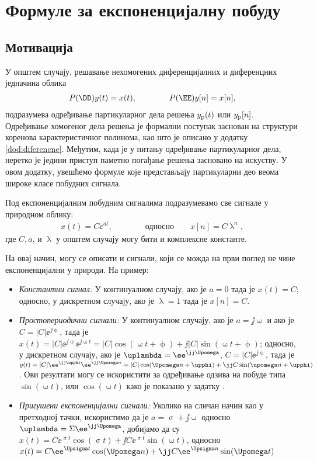 \chapter{Формуле за експоненцијалну побуду} \label{dod:exp_response}

\section*{Мотивација}

У општем случају, решавање нехомогених диференцијалних и диференцних једначина облика 
\begin{eqnarray}
    P(\DD) y(t) = x(t), \qquad\qquad P(\EE)y[n] = x[n],
\end{eqnarray}
подразумева одређивање партикуларног дела решења $y_{\rm p}(t)$ или $y_{\rm p}[n]$. 
Одређивање хомогеног дела решења је формални поступак заснован на структури  коренова карактеристичног полинома, као што је описано
у додатку \ref{dod:diferencne}. Међутим, када је у питању одређивање партикуларног дела, неретко је једини приступ паметно погађање
решења засновано на искуству. У овом додатку, увешћемо формуле које представљају партикуларни део веома широке класе побудних сигнала. 

Под експоненцијалним побудним сигналима подразумевамо све сигнале у природном облику:
\begin{eqnarray}
    x(t) = C \ee^{at}, \qquad\qquad \text{односно}  \quad\quad x[n] = C \uplambda^n,
\end{eqnarray}
где $C, a$, и $\uplambda$ у општем случају могу бити и комплексне константе. 

На овај начин, могу се описати и сигнали, који се можда на први поглед не чине експоненцијални у природи. На пример:
\begin{itemize}
    \item \emph{Константни сигнал:} У континуалном случају, ако је $a = 0$ тада је $x(t) = C$; односно, у дискретном случају, 
    ако је $\uplambda = 1$ тада је $x[n] = C$.
    \item \emph{Простопериодични сигнали:} У континуалном случају, ако је $a = \jj\upomega$ и ако је 
    $C = |C| \ee^{\jj\upphi}$, тада је 
    $x(t) = |C| \ee^{\jj\upphi} \ee^{\jj\upomega t} = |C|\cos(\upomega t + \upphi) + \jj |C| \sin(\upomega t + \upphi)$; односно, у дискретном случају, 
    ако је $\uplambda = \ee^{\jj\Upomega}$,  $C = |C| \ee^{\jj\upphi}$, тада је $y(t) =
    |C| \ee^{\jj\upphi} \ee^{\jj\Upomega n} = |C|\cos(\Upomega n + \upphi) + \jj C \sin(\upomega n + \upphi)$.
    Ови резултати могу се искористити за одређивање одзива на побуде типа $\sin(\upomega t)$, или 
    $\cos(\upomega t)$ како је показано у задатку .
    \item \emph{Пригушени експоненцијални сигнали:} Уколико на сличан начин као у претходној тачки, искористимо да је 
    $a = \upsigma + \jj\upomega$ односно $\uplambda = \Sigma \ee^{\jj\Upomega}$, добијамо да су 
    $x(t) = C\ee^{\upsigma t}\cos(\upsigma t)+ \jj C\ee^{\upsigma t}\sin(\upomega t)$, односно
    $x(t) = C\ee^{\Upsigma t}\cos(\Upomega n)+ \jj C\ee^{\Upsigma n}\sin(\Upomega t)$
\end{itemize}

